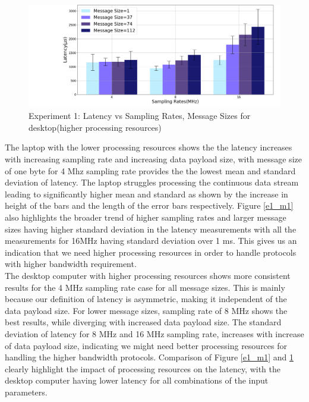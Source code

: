 \begin{figure}[h!]
\centering
\includegraphics[width=\textwidth]{Thesis/Figure/E1_M2.png}
\caption{Experiment 1: Latency vs Sampling Rates, Message Sizes for desktop(higher processing resources)}
\label{e1_m2}
\end{figure}


The laptop with the lower processing resources shows the the latency increases with increasing sampling rate and increasing data payload size, with message size of one byte for 4 Mhz sampling rate provides the the lowest mean and standard deviation of latency.
The laptop struggles processing the continuous data stream leading to significantly higher mean and standard as shown by the increase in height of the bars and the length of the error bars respectively.
Figure \ref{e1_m1} also highlights the broader trend of higher sampling rates and larger message sizes having higher standard deviation in the latency measurements with all the measurements for 16MHz having standard deviation over 1 ms.
This gives us an indication that we need higher processing resources in order to handle protocols with higher bandwidth requirement.\\

The desktop computer with higher processing resources shows more consistent results for the 4 MHz sampling rate case for all  message sizes.
This is mainly because our definition of latency is asymmetric, making it independent of the data payload size.
For lower message sizes, sampling rate of 8 MHz shows the best results, while diverging with increased data payload size.
The standard deviation of latency for 8 MHz and 16 MHz sampling rate, increases with increase of data payload size, indicating we might need better processing resources for handling the higher bandwidth protocols.
Comparison of Figure \ref{e1_m1} and \ref{e1_m2} clearly highlight the impact of processing resources on the latency, with the desktop computer having lower latency for all combinations of the input parameters.\\

